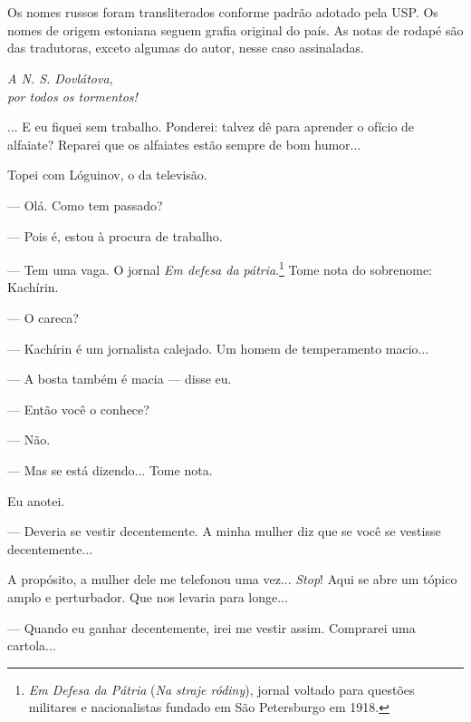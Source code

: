 \chapter*{}

\vfill
\begin{centering}
Os nomes russos foram transliterados conforme padrão adotado pela USP.
Os nomes de origem estoniana seguem grafia original do país. As notas de
rodapé são das tradutoras, exceto algumas do autor, nesse caso assinaladas.
\end{centering}
\thispagestyle{empty}



\vfill
\begin{flushright}
\emph{A N. S. Dovlátova,\\por todos os tormentos!}
\end{flushright}
\thispagestyle{empty}

\pagebreak

... E eu fiquei sem trabalho. Ponderei: talvez dê para aprender o ofício
de alfaiate? Reparei que os alfaiates estão sempre de bom humor...

Topei com Lóguinov, o da televisão.

--- Olá. Como tem passado?

--- Pois é, estou à procura de trabalho.

--- Tem uma vaga. O jornal \emph{Em defesa da pátria}.\footnote{\emph{Em
  Defesa da Pátria} (\emph{Na straje ródiny}), jornal voltado para
  questões militares e nacionalistas fundado em São Petersburgo em 1918.}
Tome nota do sobrenome: Kachírin.

--- O careca?

--- Kachírin é um jornalista calejado. Um homem de temperamento macio...

--- A bosta também é macia --- disse eu.

--- Então você o conhece?

--- Não.

--- Mas se está dizendo... Tome nota.

Eu anotei.

--- Deveria se vestir decentemente. A minha mulher diz que se você se
vestisse decentemente...

A propósito, a mulher dele me telefonou uma vez... \emph{Stop}! Aqui se
abre um tópico amplo e perturbador. Que nos levaria para longe...

--- Quando eu ganhar decentemente, irei me vestir assim. Comprarei uma
cartola...

